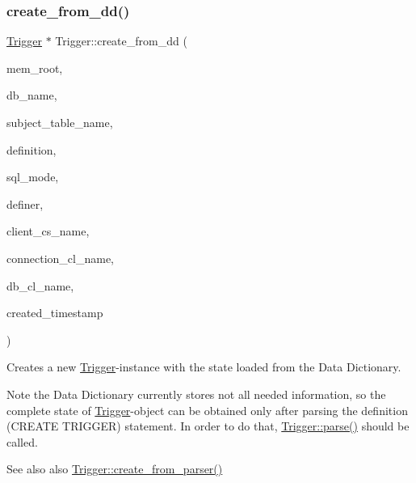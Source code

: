 \subsubsection{\texorpdfstring{create\+\_\+from\+\_\+dd()}{create\_from\_dd()}}
{\footnotesize\ttfamily \mbox{\hyperlink{classTrigger}{Trigger}} $\ast$ Trigger\+::create\+\_\+from\+\_\+dd (\begin{DoxyParamCaption}\item[{M\+E\+M\+\_\+\+R\+O\+OT $\ast$}]{mem\+\_\+root,  }\item[{const L\+E\+X\+\_\+\+C\+S\+T\+R\+I\+NG \&}]{db\+\_\+name,  }\item[{const L\+E\+X\+\_\+\+C\+S\+T\+R\+I\+NG \&}]{subject\+\_\+table\+\_\+name,  }\item[{const L\+E\+X\+\_\+\+S\+T\+R\+I\+NG \&}]{definition,  }\item[{sql\+\_\+mode\+\_\+t}]{sql\+\_\+mode,  }\item[{const L\+E\+X\+\_\+\+S\+T\+R\+I\+NG \&}]{definer,  }\item[{const L\+E\+X\+\_\+\+S\+T\+R\+I\+NG \&}]{client\+\_\+cs\+\_\+name,  }\item[{const L\+E\+X\+\_\+\+S\+T\+R\+I\+NG \&}]{connection\+\_\+cl\+\_\+name,  }\item[{const L\+E\+X\+\_\+\+S\+T\+R\+I\+NG \&}]{db\+\_\+cl\+\_\+name,  }\item[{const longlong $\ast$}]{created\+\_\+timestamp }\end{DoxyParamCaption})\hspace{0.3cm}{\ttfamily [static]}}

Creates a new \mbox{\hyperlink{classTrigger}{Trigger}}-\/instance with the state loaded from the Data Dictionary.

\begin{DoxyNote}{Note}
the Data Dictionary currently stores not all needed information, so the complete state of \mbox{\hyperlink{classTrigger}{Trigger}}-\/object can be obtained only after parsing the definition (C\+R\+E\+A\+TE T\+R\+I\+G\+G\+ER) statement. In order to do that, \mbox{\hyperlink{classTrigger_a7fc5862e0b62a16f962a692af7c95e08}{Trigger\+::parse()}} should be called.
\end{DoxyNote}
\begin{DoxySeeAlso}{See also}
also \mbox{\hyperlink{classTrigger_afa4975456fa6b8bef6cd1c695c64e33e}{Trigger\+::create\+\_\+from\+\_\+parser()}} 
\end{DoxySeeAlso}
\mbox{\label{classTrigger_afa4975456fa6b8bef6cd1c695c64e33e}} 
